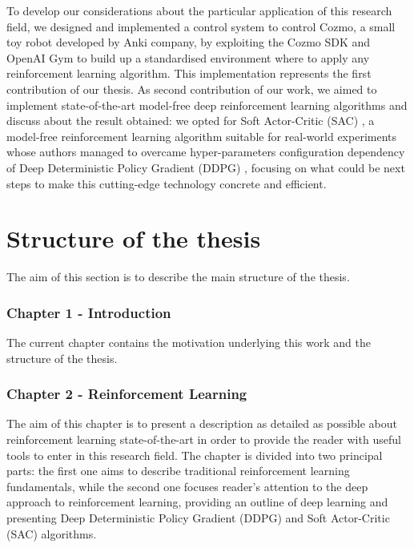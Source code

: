 To develop our considerations about the particular application of this research field, we designed and implemented a control system to control Cozmo, a small toy robot developed by Anki company, by exploiting the Cozmo SDK and OpenAI Gym to build up a standardised environment where to apply any reinforcement learning algorithm. This implementation represents the first contribution of our thesis. As second contribution of our work, we aimed to implement state-of-the-art model-free deep reinforcement learning algorithms and discuss about the result obtained: we opted for Soft Actor-Critic (SAC) \cite{haarnoja2018alg,haarnoja2018soft}, a model-free reinforcement learning algorithm suitable for real-world experiments whose authors managed to overcame hyper-parameters configuration dependency of Deep Deterministic Policy Gradient (DDPG) \cite{lillicrap2015continuous}, focusing on what could be next steps to make this cutting-edge technology concrete and efficient.

\section{Structure of the thesis}

The aim of this section is to describe the main structure of the thesis.

\subsubsection*{Chapter 1 - Introduction}

The current chapter contains the motivation underlying this work and the structure of the thesis.

\subsubsection*{Chapter 2 - Reinforcement Learning}

The aim of this chapter is to present a description as detailed as possible about reinforcement learning state-of-the-art in order to provide the reader with useful tools to enter in this research field. The chapter is divided into two principal parts: the first one aims to describe traditional reinforcement learning fundamentals, while the second one focuses reader's attention to the deep approach to reinforcement learning, providing an outline of deep learning and presenting Deep Deterministic Policy Gradient (DDPG) and Soft Actor-Critic (SAC) algorithms.

